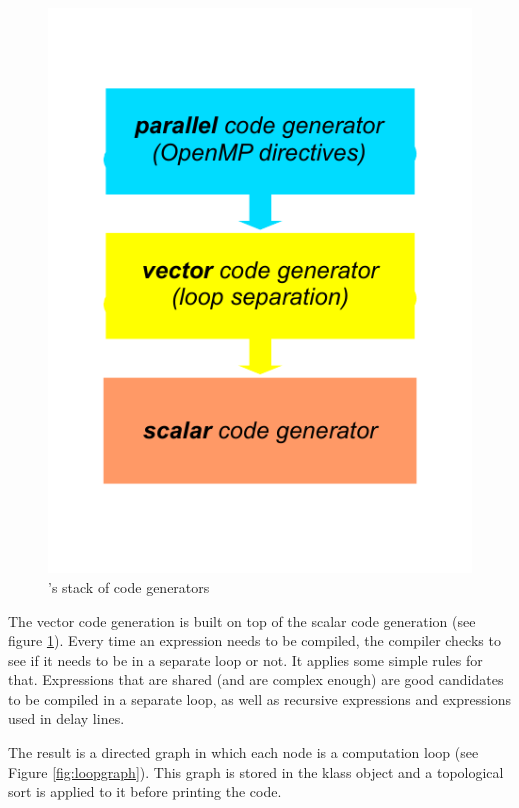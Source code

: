 \documentclass[a4paper,10pt]{book}
\begin{document}
\begin{figure}[htb]
  \centering
  \includegraphics[scale=0.75]{images/compiler-stack}
  \caption{\faust's stack of code generators}   
  \label{fig:stack}
\end{figure}


The vector code generation is built on top of the scalar code generation (see figure \ref{fig:stack}). Every time an expression needs to be compiled, the compiler checks to see if it needs to be in a separate loop or not. It applies some simple rules for that. Expressions that are shared (and are complex enough) are good candidates to be compiled in a separate loop, as well as recursive expressions and expressions used in delay lines. 

The result is a directed graph in which each node is a computation loop (see Figure \ref{fig:loopgraph}). This graph is stored in the klass object and a topological sort is applied to it before printing the code. 
\end{document}
